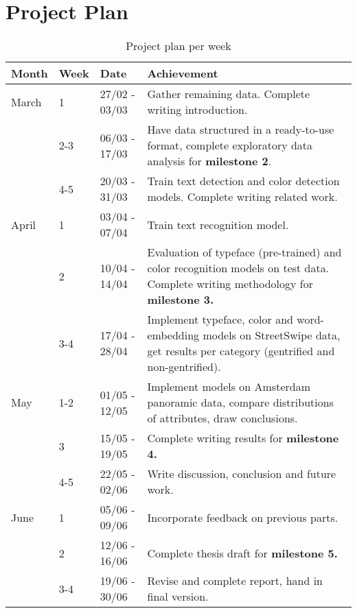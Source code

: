 \section{Project Plan}
\label{sec:project_plan}

\begin{table}[H]
    \centering
    \begin{tabular}{p{0.8cm}p{0.6cm}p{1.6cm}p{4.3cm}} \toprule \textbf{Month} & \textbf{Week} & \textbf{Date} & \textbf{Achievement} \\ \midrule
        March & 1 & 27/02 - 03/03 & Gather remaining data. Complete writing introduction. \\
            & 2-3 & 06/03 - 17/03 & Have data structured in a ready-to-use format, complete exploratory data analysis for \textbf{milestone 2}. \\
            & 4-5 & 20/03 - 31/03 & Train text detection and color detection models. Complete writing related work. \\
        April & 1 & 03/04 - 07/04 & Train text recognition model. \\
            & 2 & 10/04 - 14/04 & Evaluation of typeface (pre-trained) and color recognition models on test data. Complete writing methodology for \textbf{milestone 3.} \\
            & 3-4 & 17/04 - 28/04 & Implement typeface, color and word-embedding models on StreetSwipe data, get results per category (gentrified and non-gentrified). \\
        May & 1-2 & 01/05 - 12/05 & Implement models on Amsterdam panoramic data, compare distributions of attributes, draw conclusions. \\
            & 3 & 15/05 - 19/05 & Complete writing results for \textbf{milestone 4.} \\
            & 4-5 & 22/05 - 02/06 & Write discussion, conclusion and future work. \\
        June & 1 & 05/06 - 09/06 & Incorporate feedback on previous parts. \\
            & 2 & 12/06 - 16/06 & Complete thesis draft for \textbf{milestone 5.} \\
            & 3-4 & 19/06 - 30/06 & Revise and complete report, hand in final version. \\
    \end{tabular}
    \caption{Project plan per week}
    \label{tab:my_label}
\end{table}
